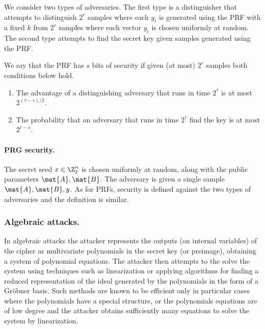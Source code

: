 We consider two types of adversaries.
The first type is a distinguisher that attempts to distinguish $2^r$ samples where each $y_i$
is generated using the PRF with a fixed $k$ from
$2^r$ samples where each vector $y_i$ is chosen uniformly at random.
The second type attempts to find the secret key given samples generated using the PRF.

We say that the PRF has $s$ bits of security if given (at most) $2^r$ samples both conditions below hold.
\begin{enumerate}
  \item The advantage of a distinguishing adversary that runs in time $2^\tau$ is at most $2^{(\tau - s)/2}$.
  \item The probability that an adversary that runs in time $2^\tau$ find the key is at most $2^{\tau - s}$.
\end{enumerate}

\paragraph{PRG security.}
The secret seed $x \in \Z_2^n$ is chosen uniformly at random, along with the public parameters $\mat{A},\mat{B}$.
The adversary is given a single sample $\mat{A},\mat{B},y$.
As for PRFs, security is defined against the two types of adversaries and the definition is similar.

\subsubsection{Algebraic attacks.}
In algebraic attacks the attacker represents the outputs (on internal variables) of the cipher as multivariate polynomials in the secret key (or preimage), obtaining a system of polynomial equations. The attacker then attempts to the solve the system using techniques such as linearization or applying algorithms for finding a reduced representation of the ideal generated by the polynomials in the form of a Gr\"{o}bner basis.
Such methods are known to be efficient only in particular cases where the polynomials have a special structure, or the
polynomials equations are of low degree and the attacker obtains sufficiently many equations to solve the system by linearization.

